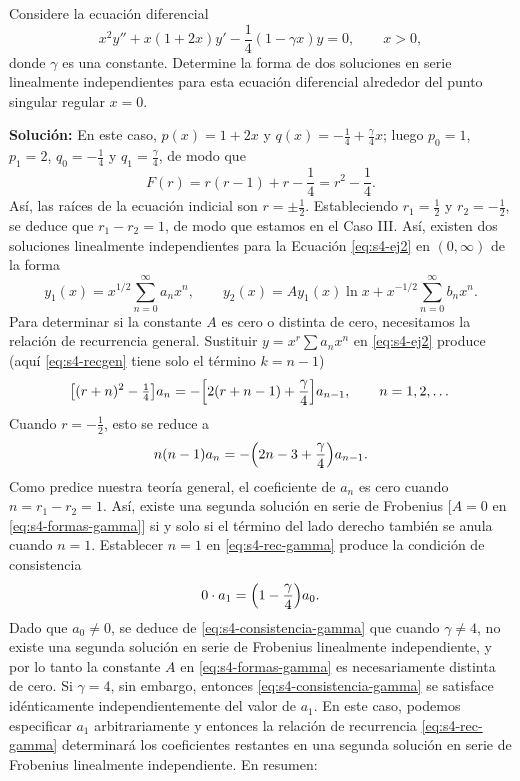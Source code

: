 \begin{example}\label{ex:s4-gamma}
    Considere la ecuación diferencial
\begin{equation}
x^2 y'' + x(1 + 2x)y' - \frac{1}{4}(1 - \gamma x)y = 0, \qquad x > 0,
\label{eq:s4-ej2}
\end{equation}
donde $\gamma$ es una constante. Determine la forma de dos soluciones en serie linealmente independientes para esta ecuación diferencial alrededor del punto singular regular $x = 0$.
 
\noindent \textbf{Solución:} \quad En este caso, $p(x)=1+2x$ y $q(x)=-\frac14+\frac{\gamma}{4}x$; luego $p_0 = 1$, $p_1=2$, $q_0 = -\frac{1}{4}$ y $q_1=\frac\gamma4$, de modo que
\[ F(r) = r(r - 1) + r - \frac{1}{4} = r^2 - \frac{1}{4}. \]
Así, las raíces de la ecuación indicial son $r = \pm \frac{1}{2}$. Estableciendo $r_1 = \frac{1}{2}$ y $r_2 = -\frac{1}{2}$, se deduce que $r_1 - r_2 = 1$, de modo que estamos en el Caso III. Así, existen dos soluciones linealmente independientes para la Ecuación \eqref{eq:s4-ej2} en $(0, \infty)$ de la forma
\begin{equation}
y_1(x) = x^{1/2} \sum_{n=0}^{\infty} a_n x^n, \qquad y_2(x) = A y_1(x) \ln x + x^{-1/2} \sum_{n=0}^{\infty} b_n x^n.
\label{eq:s4-formas-gamma}
\end{equation}
Para determinar si la constante $A$ es cero o distinta de cero, necesitamos la relación de recurrencia general. Sustituir $y=x^r\sum a_nx^n$ en \eqref{eq:s4-ej2} produce (aquí \eqref{eq:s4-recgen} tiene solo el término $k=n-1$)
\[ \bigl[(r+n)^2-\tfrac14\bigr]a_n=-\Bigl[2(r+n-1)+\frac{\gamma}{4}\Bigr]a_{n-1},\qquad n=1,2,\dots \]
Cuando $r=-\frac12$, esto se reduce a
\begin{equation}
n(n-1)a_n=-\Bigl(2n-3+\frac{\gamma}{4}\Bigr)a_{n-1}.
\label{eq:s4-rec-gamma}
\end{equation}
Como predice nuestra teoría general, el coeficiente de $a_n$ es cero cuando $n=r_1-r_2=1$. Así, existe una segunda solución en serie de Frobenius [$A=0$ en \eqref{eq:s4-formas-gamma}] si y solo si el término del lado derecho también se anula cuando $n=1$. Establecer $n=1$ en \eqref{eq:s4-rec-gamma} produce la condición de consistencia
\begin{equation}
0\cdot a_1=\Bigl(1-\frac{\gamma}{4}\Bigr)a_0.
\label{eq:s4-consistencia-gamma}
\end{equation}
Dado que $a_0\neq0$, se deduce de \eqref{eq:s4-consistencia-gamma} que cuando $\gamma\neq4$, no existe una segunda solución en serie de Frobenius linealmente independiente, y por lo tanto la constante $A$ en \eqref{eq:s4-formas-gamma} es necesariamente distinta de cero. Si $\gamma=4$, sin embargo, entonces \eqref{eq:s4-consistencia-gamma} se satisface idénticamente independientemente del valor de $a_1$. En este caso, podemos especificar $a_1$ arbitrariamente y entonces la relación de recurrencia \eqref{eq:s4-rec-gamma} determinará los coeficientes restantes en una segunda solución en serie de Frobenius linealmente independiente. En resumen:
 

\end{example}
